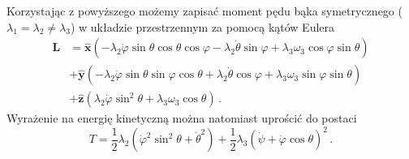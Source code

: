 \documentclass[../main.tex]{subfiles}
\begin{document}
Korzystając z powyższego możemy zapisać moment pędu bąka symetrycznego
(\(\lambda_1=\lambda_2\neq\lambda_3\)) w układzie przestrzennym za pomocą kątów Eulera
\begin{equation*}
    \begin{split}
        \mathbf{L}&=\mathbf{\hat{x}}\left(-\lambda_2\dot\varphi\sin\theta\cos\theta\cos\varphi-\lambda_2\dot\theta\sin\varphi+\lambda_3\omega_3\cos\varphi\sin\theta\right)\\
        &+\mathbf{\hat{y}}\left(-\lambda_2\dot\varphi\sin\theta\sin\varphi\cos\theta+\lambda_2\dot\theta\cos\varphi+\lambda_3\omega_3\sin\varphi\sin\theta\right)\\
        &+\mathbf{\hat{z}}\left(\lambda_2\dot\varphi\sin^2\theta +\lambda_3\omega_3\cos\theta\right)\,.
    \end{split}
\end{equation*}
Wyrażenie na energię kinetyczną można natomiast uprościć do postaci
\begin{equation*}
    T=\frac{1}{2}\lambda_2(\dot{\varphi}^2\sin^2\theta+\dot{\theta}^2)+\frac{1}{2}\lambda_3(\dot\psi+\dot\varphi\cos\theta)^2\,.
\end{equation*}
\end{document}
